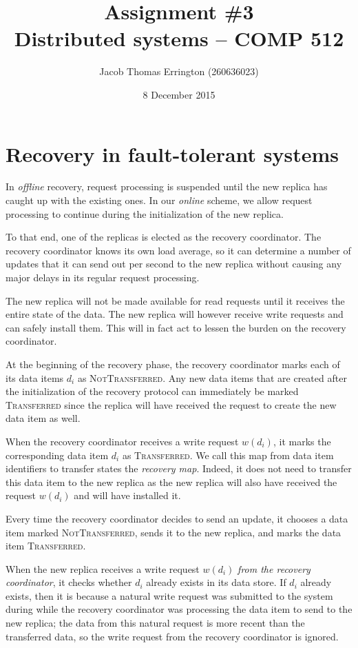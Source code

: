 \documentclass[letterpaper,11pt]{article}
\author{Jacob Thomas Errington (260636023)}
\title{Assignment \#3\\Distributed systems -- COMP 512}
\date{8 December 2015}
\begin{document}
\maketitle

\section{Recovery in fault-tolerant systems}

In \emph{offline} recovery, request processing is suspended until the new
replica has caught up with the existing ones. In our \emph{online} scheme, we
allow request processing to continue during the initialization of the new
replica.

To that end, one of the replicas is elected as the recovery coordinator. The
recovery coordinator knows its own load average, so it can determine a number
of updates that it can send out per second to the new replica without causing
any major delays in its regular request processing.

The new replica will not be made available for read requests until it receives
the entire state of the data.
The new replica will however receive write requests and can safely install
them. This will in fact act to lessen the burden on the recovery coordinator.

At the beginning of the recovery phase, the recovery coordinator marks each of
its data items $d_i$ as \textsc{NotTransferred}. Any new data items that are
created after the initialization of the recovery protocol can immediately be
marked \textsc{Transferred} since the replica will have received the request to
create the new data item as well.

When the recovery coordinator receives a write request $w(d_i)$, it marks the
corresponding data item $d_i$ as \textsc{Transferred}. We call this map from
data item identifiers to transfer states the \emph{recovery map}. Indeed, it
does not need to transfer this data item to the new replica as the new replica
will also have received the request $w(d_i)$ and will have installed it.

Every time the recovery coordinator decides to send an update, it chooses a
data item marked \textsc{NotTransferred}, sends it to the new replica, and
marks the data item \textsc{Transferred}.

When the new replica receives a write request $w(d_i)$ \emph{from the recovery
coordinator}, it checks whether $d_i$ already exists in its data store. If
$d_i$ already exists, then it is because a natural write request was submitted
to the system during while the recovery coordinator was processing the data
item to send to the new replica; the data from this natural request is more
recent than the transferred data, so the write request from the recovery
coordinator is ignored.
\end{document}
